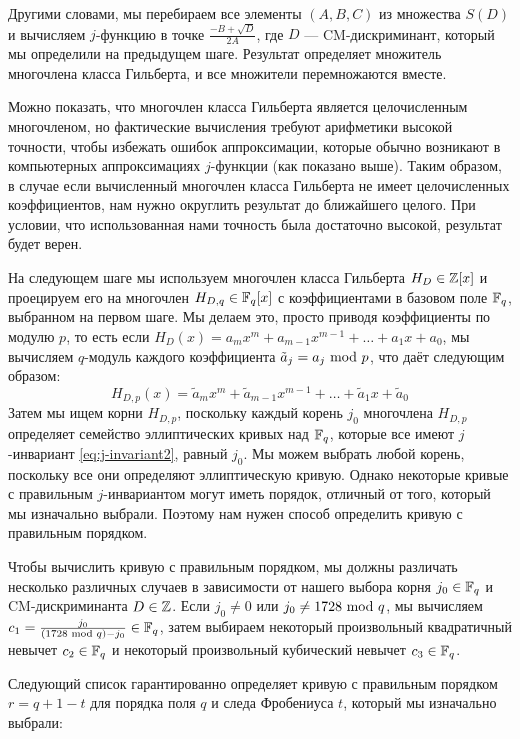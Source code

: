 Другими словами, мы перебираем все элементы $(A,B,C)$ из множества $S(D)$ и вычисляем $j$-функцию в точке $\frac{-B + \sqrt{D}}{2A}$, где $D$ — CM-дискриминант, который мы определили на предыдущем шаге. Результат определяет множитель многочлена класса Гильберта, и все множители перемножаются вместе.

Можно показать, что многочлен класса Гильберта является целочисленным многочленом, но фактические вычисления требуют арифметики высокой точности, чтобы избежать ошибок аппроксимации, которые обычно возникают в компьютерных аппроксимациях $j$-функции (как показано выше). Таким образом, в случае если вычисленный многочлен класса Гильберта не имеет целочисленных коэффициентов, нам нужно округлить результат до ближайшего целого. При условии, что использованная нами точность была достаточно высокой, результат будет верен.

На следующем шаге мы используем многочлен класса Гильберта $H_D\in \mathbb{Z}[x]$ и проецируем его на многочлен $H_{D,q}\in\mathbb{F}_q[x]$ с коэффициентами в базовом поле $\mathbb{F}_q$, выбранном на первом шаге. Мы делаем это, просто приводя коэффициенты по модулю $p$, то есть если $H_D(x)= a_mx^m +a_{m-1}x^{m-1}+\ldots + a_1 x + a_0$, мы вычисляем $q$-модуль каждого коэффициента
$\tilde{a}_j = a_j \text{ mod } p$, что даёт  следующим образом:
$$
H_{D,p}(x)=\tilde{a}_mx^m +\tilde{a}_{m-1}x^{m-1}+\ldots + \tilde{a}_1 x + \tilde{a}_0
$$
Затем мы ищем корни $H_{D,p}$, поскольку каждый корень $j_0$ многочлена $H_{D,p}$ определяет семейство эллиптических кривых над $\mathbb{F}_q$, которые все имеют $j$-инвариант \ref{eq:j-invariant2}, равный $j_0$. Мы можем выбрать любой корень, поскольку все они определяют эллиптическую кривую. Однако некоторые кривые с правильным $j$-инвариантом могут иметь порядок, отличный от того, который мы изначально выбрали. Поэтому нам нужен способ определить кривую с правильным порядком. 

Чтобы вычислить кривую с правильным порядком, мы должны различать несколько различных случаев в зависимости от нашего выбора корня $j_0\in \mathbb{F}_q$ и CM-дискриминанта $D\in \mathbb{Z}$. Если $j_0\neq 0$ или $j_0\neq 1728 \text{ mod } q$, мы вычисляем $c_1=\frac{j_0}{(1728 \text{ mod } q) -j_0}\in \mathbb{F}_q$, затем выбираем некоторый произвольный квадратичный невычет $c_2\in \mathbb{F}_q$ и некоторый произвольный кубический невычет $c_3\in \mathbb{F}_q$. 

Следующий список гарантированно определяет кривую с правильным порядком $r= q+1 -t$ для порядка поля $q$ и следа Фробениуса $t$, который мы изначально выбрали:

